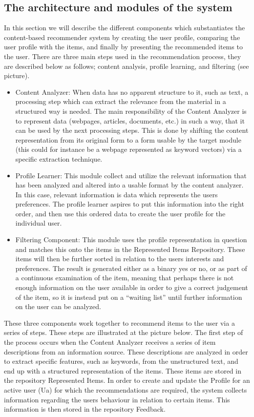 \subsection{The architecture and modules of the system}
In this section we will describe the different components which substantiates the content-based recommender system by creating the user profile, comparing the user profile with the items, and finally by presenting the recommended items to the user. 
There are three main steps used in the recommendation process, they are described below as follows; content analysis, profile learning, and filtering (see picture).
\begin{itemize}
	\item Content Analyzer: When data has no apparent structure to it, such as text, a processing step which can extract the relevance from the material in a structured way is needed. The main responsibility of the Content Analyzer is to represent data (webpages, articles, documents, etc.) in such a way, that it can be used by the next processing steps. This is done by shifting the content representation from its original form to a form usable by the target module (this could for instance be a webpage represented as keyword vectors) via a specific extraction technique.
	\item Profile Learner: This module collect and utilize the relevant information that has been analyzed and altered into a usable format by the content analyzer. In this case, relevant information is data which represents the users preferences. The profile learner aspires to put this information into the right order, and then use this ordered data to create the user profile for the individual user.
	\item Filtering Component: This module uses the profile representation in question and matches this onto the items in the Represented Items Repository. These items will then be further sorted in relation to the users interests and preferences. The result is generated either as a binary yes or no, or as part of a continuous examination of the item, meaning that perhaps there is not enough information on the user available in order to give a correct judgement of the item, so it is instead put on a “waiting list” until further information on the user can be analyzed.
\end{itemize}
These three components work together to recommend items to the user via a series of steps. These steps are illustrated at the picture below. The first step of the process occurs when the Content Analyzer receives a series of item descriptions from an information source. These descriptions are analyzed in order to extract specific features, such as keywords, from the unstructured text, and end up with a structured representation of the items. These items are stored in the repository Represented Items. In order to create and update the Profile for an active user (Ua) for which the recommendations are required, the system collects information regarding the users behaviour in relation to certain items. This information is then stored in the repository Feedback.
